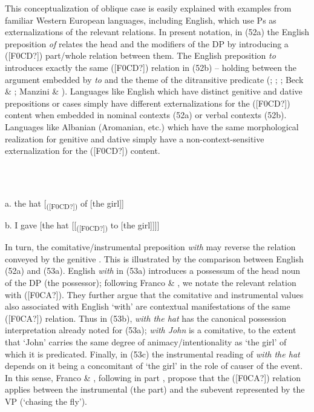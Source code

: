 \documentclass[output=paper]{langsci/langscibook}
\begin{document}
\begin{styleSfondomedioiColorexi}
This conceptualization of oblique case is easily explained with examples from familiar Western European languages, including English, which use Ps as externalizations of the relevant relations. In present notation, in (52a) the English preposition \textit{of} relates the head and the modifiers of the DP by introducing a ([F0CD?]) part/whole relation between them. The English preposition \textit{to} introduces exactly the same ([F0CD?]) relation in (52b) – holding between the argument embedded by \textit{to} and the theme of the ditransitive predicate (\citealt{Kayne1984}; \citealt{Pesetsky1995}; \citealt{Harley2002}; Beck \& \citealt{Johnson2002}; Manzini \& \citealt{Franco2016}).  Languages like English which have distinct genitive and dative prepositions or cases simply have different externalizations for the ([F0CD?]) content when embedded in nominal contexts (52a) or verbal contexts (52b). Languages like Albanian (Aromanian, etc.) which have the same morphological realization for genitive and dative simply have a non-context-sensitive externalization for the ([F0CD?]) content.
\end{styleSfondomedioiColorexi}

\begin{styleSfondomedioiColorexi}
\ea%
    \label{ex:key:52}
    \gll\\
        \\
    \glt
    \z

          a.  the hat [\textsubscript{([F0CD?])} of [the girl]]
\end{styleSfondomedioiColorexi}

\begin{styleSfondomedioiColorexi}
  b.  I gave [the hat [[\textsubscript{([F0CD?])} to [the girl]]]]
\end{styleSfondomedioiColorexi}

\begin{styleSfondomedioiColorexi}
In turn, the comitative/instrumental preposition \textit{with} may reverse the relation conveyed by the genitive \citep{Levinson2011}. This is illustrated by the comparison between English (52a) and (53a). English \textit{with} in (53a) introduces a possessum of the head noun of the DP (the possessor); following Franco \& \citet{Manzini2017}, we notate the relevant relation with ([F0CA?]). They further argue that the comitative and instrumental values also associated with English ‘with’ are contextual manifestations of the same ([F0CA?]) relation. Thus in (53b), \textit{with the hat} has the canonical possession interpretation already noted for (53a); \textit{with John} is a comitative, to the extent that ‘John’ carries the same degree of animacy/intentionality as ‘the girl’ of which it is predicated. Finally, in (53c) the instrumental reading of \textit{with the hat} depends on it being a concomitant of ‘the girl’ in the role of causer of the event. In this sense, Franco \& \citet{Manzini2017}, following in part \citet{Bruening2012}, propose that the ([F0CA?]) relation applies between the instrumental (the part) and the subevent represented by the VP (‘chasing the fly’).
\end{styleSfondomedioiColorexi}
\end{document}

